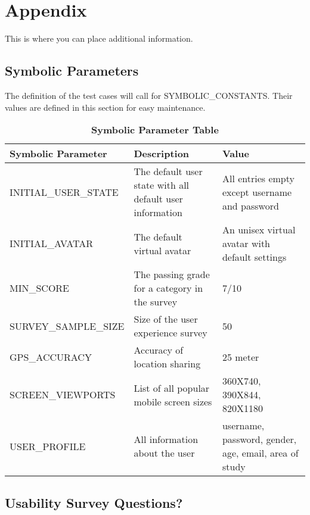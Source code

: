 \documentclass[12pt, titlepage]{article}
\begin{document}




\newpage

\section{Appendix}

This is where you can place additional information.

\subsection{Symbolic Parameters}

The definition of the test cases will call for SYMBOLIC\_CONSTANTS.
Their values are defined in this section for easy maintenance.

\begin{table}[h]
\caption{\bf Symbolic Parameter Table}
\begin{tabular}{|p{0.4\linewidth} | p{0.3\linewidth}| p{0.3\linewidth} |}
\hline
\multicolumn{1}{|l}{\bfseries Symbolic Parameter} & \multicolumn{1}{|l|}{\bfseries Description} & \multicolumn{1}{l|}{\bfseries Value}\\
\hline
INITIAL\_USER\_STATE & The default user state with all default user information & All entries empty except username and password \\
\hline
INITIAL\_AVATAR & The default virtual avatar & An unisex virtual avatar with default settings \\
\hline
MIN\_SCORE & The passing grade for a category in the survey & 7/10\\
\hline
SURVEY\_SAMPLE\_SIZE & Size of the user experience survey & 50\\
\hline
GPS\_ACCURACY & Accuracy of location sharing & 25 meter\\
\hline
SCREEN\_VIEWPORTS & List of all popular mobile screen sizes & 360X740, 390X844, 820X1180\\
\hline
USER\_PROFILE & All information about the user & username, password, gender, age, email, area of study\\
\hline
\end{tabular}
\end{table}

\subsection{Usability Survey Questions?}
\label{sec:survey}
\end{document}
